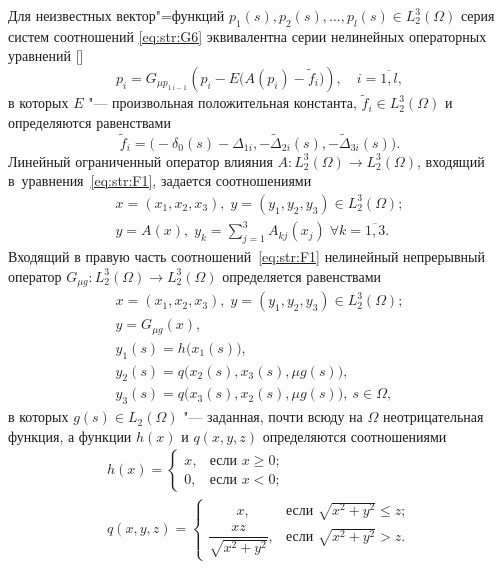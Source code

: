 Для неизвестных  вектор"=функций $p_{1} (s), p_{2} (s), \dots, p_{l} (s) \in L_{2}^{3} (\Omega)$ серия систем соотношений \eqref{eq:str:G6} эквивалентна серии нелинейных операторных уравнений []
\begin{equation}
p_{i} =G_{\mu p_{1\,i-1} }\left(p_{i} -E \bigl(A\left(p_{i} \right)-\tilde{f}_{i} \bigr)\right),\quad i=\overline{1, l},\label{eq:str:F1}
\end{equation}
в которых  $E$ "--- произвольная положительная константа, $\tilde{f}_{i}\in L_{2}^{3} (\Omega)$  и определяются равенствами 
$$\tilde{f}_{i} =\bigl(-\delta _{0} (s)-\Delta _{1i} , -\tilde{\Delta }_{2i} (s),  -\tilde{\Delta }_{3i} (s)\bigr).$$
Линейный ограниченный оператор влияния $A \colon L_{2}^{3} (\Omega)\to L_{2}^{3} (\Omega)$, входящий в~уравнения~\eqref{eq:str:F1}, задается соотношениями
\begin{equation} 
\begin{array}{l} 
x=\left(x_{1} ,x_{2} ,x_{3} \right), \; y=\left(y_{1} ,y_{2} ,y_{3} \right)\in L_{2}^{3} (\Omega); 
\\ 
\displaystyle y=A(x), \; y_{k} =\sum _{j=1}^{3}A_{kj} (x_{j} )\; \forall k=\overline{1, 3} . 
\end{array}
 \label{eq:str:F2}
\end{equation}  
Входящий в правую часть соотношений~\eqref{eq:str:F1} нелинейный непрерывный оператор  $G_{\mu g} \colon L_{2}^{3} (\Omega)\to L_{2}^{3} (\Omega)$ определяется равенствами
\begin{equation} 
\label{eq:str:F3} 
\begin{array}{l} 
x=(x_{1},x_{2},x_{3} ), \;  y=(y_{1} ,y_{2} ,y_{3} )\in L_{2}^{3} (\Omega); 
\\ 
y=G_{\mu g} (x), 
\\ 
y_{1} (s)=h\bigl(x_{1} (s)\bigr), 
\\ 
y_{2} (s)=q\bigl(x_{2} (s),x_{3} (s),\mu g(s) \bigr), 
\\ 
y_{3} (s)=q\bigl(x_{3} (s),x_{2} (s),\mu g(s)\bigr),~  s\in \Omega  ,
\end{array}
 \end{equation}
в которых $g(s)\in L_{2} (\Omega)$ "--- заданная, почти всюду на $\Omega $ неотрицательная функция, а функции $h(x)$ и $q(x,y,z)$ определяются соотношениями
\begin{equation} 
\label{eq:str:F4}
\begin{array}{l} 
h(x)= \begin{cases}
x,&\text{если  $x\ge 0;$} 
\\ 
0,& \text{если $x<0;$}\end{cases} \\ 
q (x,y,z)=\begin{cases}  
\qquad x,& \text{если $\sqrt{x^{2} +y^{2} } \le z;$} 
\\[2mm] 
\dfrac{xz}{\sqrt{x^{2} +y^{2} } } ,&\text{если $\sqrt{x^{2} +y^{2} } >z.$}
\end{cases} \end{array}  
\end{equation}
